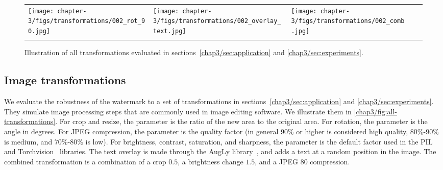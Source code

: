 \begin{figure}[b!]
\begin{tabular}{*{5}{l}}
        \begin{minipage}{.16\linewidth}\texttt{[image: chapter-3/figs/transformations/002\_rot\_90.jpg]}\end{minipage} &  
        \begin{minipage}{.16\linewidth}\texttt{[image: chapter-3/figs/transformations/002\_overlay\_text.jpg]}\end{minipage} &  
        \begin{minipage}{.16\linewidth}\texttt{[image: chapter-3/figs/transformations/002\_comb.jpg]}\end{minipage} 
        \\ \\
    \end{tabular}
\caption{Illustration of all transformations evaluated in sections~\ref{chap3/sec:application} and \ref{chap3/sec:experiments}.}
\label{chap3/fig:all-transformations}
\end{figure}




\subsection{Image transformations}\label{chap3/app:transformations}
We evaluate the robustness of the watermark to a set of transformations in sections~\ref{chap3/sec:application} and \ref{chap3/sec:experiments}.
They simulate image processing steps that are commonly used in image editing software.
We illustrate them in \autoref{chap3/fig:all-transformations}.
For crop and resize, the parameter is the ratio of the new area to the original area.
For rotation, the parameter is the angle in degrees.
For JPEG compression, the parameter is the quality factor (in general 90\% or higher is considered high quality, 80\%-90\% is medium, and 70\%-80\% is low).
For brightness, contrast, saturation, and sharpness, the parameter is the default factor used in the PIL and Torchvision~\citep{marcel2010torchvision} libraries.
The text overlay is made through the AugLy library~\citep{papakipos2022augly}, and adds a text at a random position in the image.
The combined transformation is a combination of a crop $0.5$, a brightness change $1.5$, and a JPEG $80$ compression.


